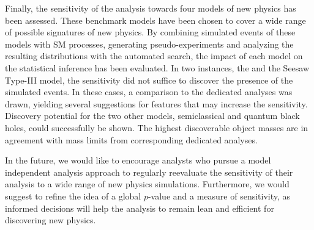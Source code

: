 Finally, the sensitivity of the analysis towards four models of new physics has been assessed. These benchmark models have been chosen to cover a wide range of possible signatures of new physics. By combining simulated events of these models with \acl{SM} processes, generating pseudo-experiments and analyzing the resulting distributions with the automated search, the impact of each model on the statistical inference has been evaluated. 
In two instances, the \PWprime and the Seesaw Type-III model, the sensitivity did not suffice to discover the presence of the simulated events. In these cases, a comparison to the dedicated analyses was drawn, yielding several suggestions for features that may increase the sensitivity.
Discovery potential for the two other models, semiclassical and quantum black holes, could successfully be shown. The highest discoverable object masses are in agreement with mass limits from corresponding dedicated analyses.

In the future, we would like to encourage analysts who pursue a model independent analysis approach to regularly reevaluate the sensitivity of their analysis to a wide range of new physics simulations. Furthermore, we would suggest to refine the idea of a global $p$-value and a measure of sensitivity, as informed decisions will help the analysis to remain lean and efficient for discovering new physics.

